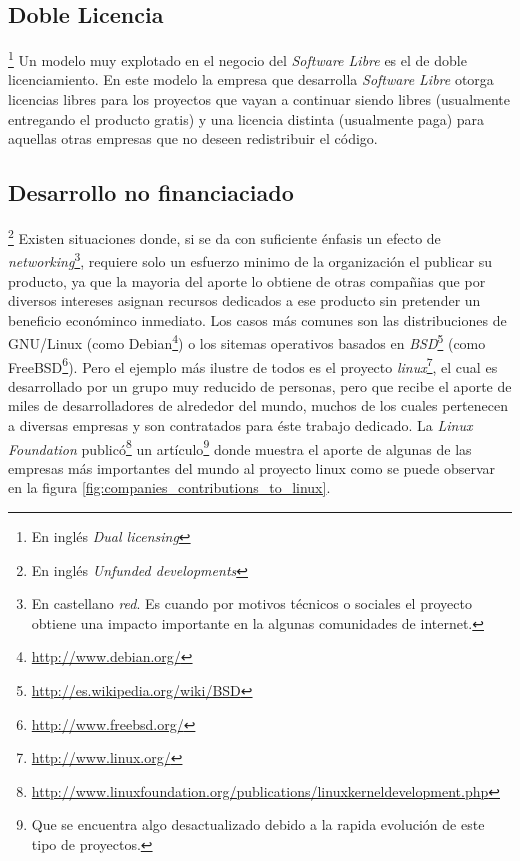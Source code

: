 \subsection{Doble Licencia}\footnote{En ingl\'es \emph{Dual licensing}}
%
Un modelo muy explotado en el negocio del \emph{Software Libre} es el de doble
licenciamiento. En este modelo la empresa que desarrolla \emph{Software
Libre} otorga licencias libres para los proyectos que vayan a continuar siendo
libres (usualmente entregando el producto gratis) y una licencia distinta
(usualmente paga) para aquellas otras empresas que no deseen redistribuir el
c\'odigo. 

\subsection{Desarrollo no financiaciado}\footnote{En ingl\'es \emph{Unfunded
developments}}
%
Existen situaciones donde, si se da con suficiente \'enfasis un efecto de
\emph{networking}\footnote{En castellano \emph{red}. Es cuando por motivos
t\'ecnicos o sociales el proyecto obtiene una impacto importante en la
algunas comunidades de internet.}, requiere solo un esfuerzo minimo de la
organizaci\'on el publicar su producto, ya que la mayoria del aporte lo
obtiene de otras compa\~nias que por diversos intereses asignan recursos
dedicados a ese producto sin pretender un beneficio econ\'ominco inmediato.
Los casos m\'as comunes son las distribuciones de GNU/Linux (como
Debian\footnote{\url{http://www.debian.org/}}) o los sitemas operativos
basados en \emph{BSD}\footnote{\url{http://es.wikipedia.org/wiki/BSD}} (como
FreeBSD\footnote{\url{http://www.freebsd.org/}}). Pero el ejemplo m\'as
ilustre de todos es el proyecto
\emph{linux}\footnote{\url{http://www.linux.org/}}, el cual es desarrollado
por un grupo muy reducido de personas, pero que recibe el aporte de miles de
desarrolladores de alrededor del mundo, muchos de los cuales pertenecen a
diversas empresas y son contratados para \'este trabajo dedicado.
La \emph{Linux Foundation}
public\'o\footnote{\url{
http://www.linuxfoundation.org/publications/linuxkerneldevelopment.php}} un
art\'iculo\footnote{Que se encuentra algo desactualizado debido a la rapida
evoluci\'on de este tipo de proyectos.} donde muestra el aporte de algunas de
las empresas m\'as importantes del mundo al proyecto linux como se puede
observar en la figura \ref{fig:companies_contributions_to_linux}.


